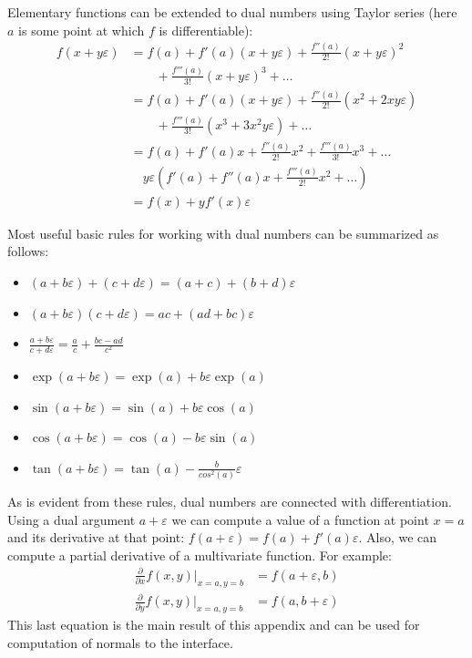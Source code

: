 \documentclass[1p]{elsarticle}
\begin{document}
Elementary functions can be extended to dual numbers using Taylor series (here
$a$ is some point at which $f$ is differentiable):
\begin{equation}
  \begin{aligned}
    f(x + y\varepsilon) &= f(a) + f'(a)(x + y\varepsilon) + \frac{f''(a)}{2!}(x + y\varepsilon)^2 \\
    & \qquad + \frac{f'''(a)}{3!}(x + y\varepsilon)^3 + \dots \\
    &= f(a) + f'(a)(x + y\varepsilon) + \frac{f''(a)}{2!}(x^2 + 2xy\varepsilon) \\
    & \qquad + \frac{f'''(a)}{3!}(x^3 + 3x^2y\varepsilon) + \dots \\
    &= f(a) + f'(a)x + \frac{f''(a)}{2!}x^2 + \frac{f'''(a)}{3!}x^3 + \dots \\
    & \quad y\varepsilon(f'(a) + f''(a)x + \frac{f'''(a)}{2!}x^2 + \dots) \\
    &= f(x) + yf'(x)\varepsilon
  \end{aligned}
\end{equation}

Most useful basic rules for working with dual numbers can be summarized as follows:
\begin{itemize}
\item $(a + b\varepsilon) + (c + d\varepsilon) = (a + c) + (b + d)\varepsilon$
\item $(a + b\varepsilon) (c + d\varepsilon) = ac + (ad + bc)\varepsilon$
\item $\frac{a + b\varepsilon}{c + d\varepsilon} = \frac{a}{c} + \frac{bc - ad}{c^2}$
\item $\exp(a + b\varepsilon) = \exp(a) + b\varepsilon\exp(a)$
\item $\sin(a + b\varepsilon) = \sin(a) + b\varepsilon\cos(a)$
\item $\cos(a + b\varepsilon) = \cos(a) - b\varepsilon\sin(a)$
\item $\tan(a + b\varepsilon) = \tan(a) - \frac{b}{cos^2(a)}\varepsilon$
\end{itemize}

As is evident from these rules, dual numbers are connected with
differentiation. Using a dual argument $a + \varepsilon$ we can compute a value
of a function at point $x = a$ and its derivative at that point:
$f(a + \varepsilon) = f(a) + f'(a)\varepsilon$. Also, we can compute a partial
derivative of a multivariate function. For example:
\begin{equation}
  \begin{aligned}
    \frac{\partial}{\partial x} f(x, y) \vert_{x = a, y = b} &= f(a + \varepsilon,
    b) \\
    \frac{\partial}{\partial y} f(x, y) \vert_{x = a, y = b} &= f(a, b +
    \varepsilon)
  \end{aligned}
  \label{eq:autonormals}
\end{equation}
This last equation is the main result of this appendix and can be used for
computation of normals to the interface.


\end{document}
